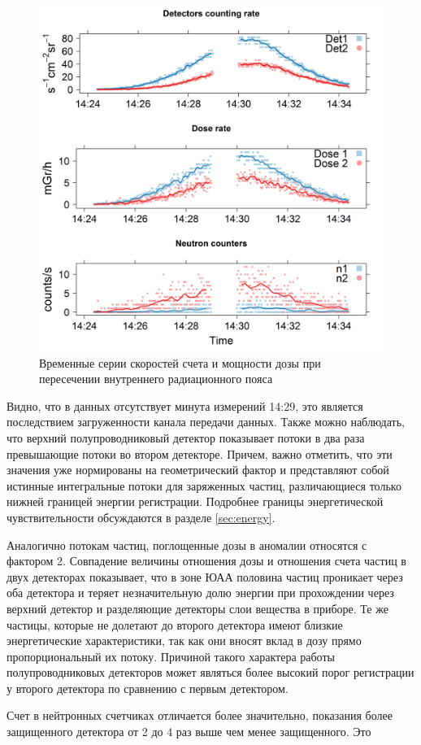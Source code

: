 \begin{figure}
	\centering
	\includegraphics[width=0.5\linewidth]{images/results/depron_sec_log_new08-29-1614-24-23}
	\caption{Временные серии скоростей счета и мощности дозы при пересечении внутреннего радиационного пояса}	\label{fig:depronseclognew08-29-1614-24-23}
\end{figure}

Видно, что в данных отсутствует минута измерений 14:29, это является последствием загруженности канала передачи данных. Также можно наблюдать, что верхний полупроводниковый детектор показывает потоки в два раза превышающие потоки во втором детекторе. Причем, важно отметить, что эти значения уже нормированы на геометрический фактор и представляют собой истинные интегральные потоки для заряженных частиц, различающиеся только нижней границей энергии регистрации. Подробнее границы энергетической чувствительности обсуждаются в разделе \ref{sec:energy}.

Аналогично потокам частиц, поглощенные дозы в аномалии относятся с фактором 2. Совпадение  величины отношения дозы и отношения счета частиц в двух детекторах показывает, что в зоне ЮАА половина частиц проникает через оба детектора и теряет незначительную долю энергии при прохождении через верхний детектор и разделяющие детекторы слои вещества в приборе. Те же частицы, которые не долетают до второго детектора имеют близкие энергетические характеристики, так как они вносят вклад в дозу прямо пропорциональный их потоку. Причиной такого характера работы полупроводниковых детекторов может являться более высокий порог регистрации у второго детектора по сравнению с первым детектором.

Счет в нейтронных счетчиках отличается более значительно, показания более защищенного детектора от 2 до 4 раз выше чем менее защищенного. Это 




